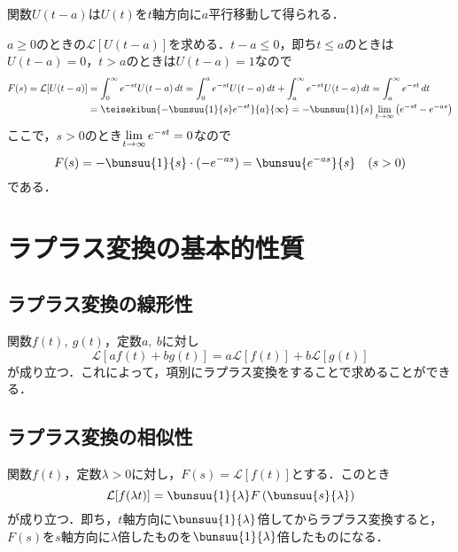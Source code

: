 関数$U(t - a)$は$U(t)$を$t$軸方向に$a$平行移動して得られる．

$a \ge 0$のときの$\mathcal{L}[U(t - a)]$を求める．$t - a \le 0$，即ち$t \le a$のときは$U(t - a) = 0$，$t > a$のときは$U(t - a) = 1$なので
\begin{align*}
	F(s) = \mathcal{L}[U(t - a)] &= \int_{0}^{\infty} e^{-st}U(t - a)\,dt = \int_{0}^{a} e^{-st}U(t - a)\,dt + \int_{a}^{\infty} e^{-st}U(t - a)\,dt = \int_{a}^{\infty} e^{-st}\,dt\\
	&= \teisekibun{{
		-\bunsuu{1}{s}e^{-st}
	}}{a}{\infty}
	= -\bunsuu{1}{s}\lim_{t \to \infty} \left(
		e^{-st} - e^{-as}
	\right)
\end{align*}
ここで，$s > 0$のとき$\lim\limits_{t \to \infty} e^{-st} = 0$なので
\begin{equation*}
	F(s) = -\bunsuu{1}{s}\cdot(-e^{-as}) = \bunsuu{e^{-as}}{s} \quad (s > 0)
\end{equation*}
である．



\section{ラプラス変換の基本的性質}
\subsection{ラプラス変換の線形性}

関数$f(t),\ g(t)$，定数$a,\ b$に対し
\begin{equation}
	\mathcal{L}[af(t) + bg(t)] = a\mathcal{L}[f(t)] + b\mathcal{L}[g(t)]
\end{equation}
が成り立つ．これによって，項別にラプラス変換をすることで求めることができる．



\subsection{ラプラス変換の相似性}

関数$f(t)$，定数$\lambda > 0$に対し，$F(s) = \mathcal{L}[f(t)]$とする．このとき
\begin{equation}
	\mathcal{L}[f(\lambda t)] = \bunsuu{1}{\lambda}F\left(\bunsuu{s}{\lambda}\right)
\end{equation}
が成り立つ．即ち，$t$軸方向に$\bunsuu{1}{\lambda}$倍してからラプラス変換すると，$F(s)$を$s$軸方向に$\lambda$倍したものを$\bunsuu{1}{\lambda}$倍したものになる．

